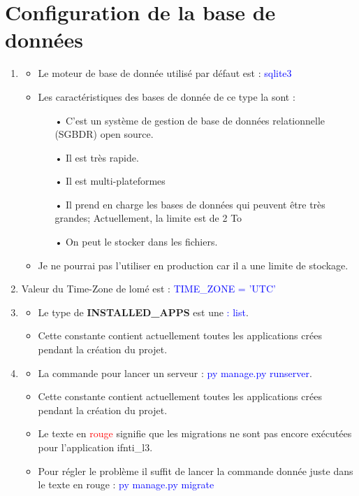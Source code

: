 \documentclass[10pt,a4paper]{article}
\begin{document}
\section{Configuration de la base de données}

\begin{enumerate}
\item 
\begin{itemize}
\item[]
\item Le moteur de base de donnée utilisé par défaut est  : \textcolor{blue}{sqlite3}

\item Les caractéristiques des bases de donnée de ce type la sont : \\
\begin{itemize}
\item[•] C'est un système de gestion de base de données relationnelle (SGBDR) open source.
\item[•] Il est très rapide.
\item[•] Il est multi-plateformes
\item[•] Il prend en charge les bases de données qui peuvent être très grandes; Actuellement, la limite est de 2 To
\item[•] On peut le stocker dans les fichiers.
\end{itemize}
\item Je ne pourrai pas l'utiliser en production car il a une limite de stockage.
\end{itemize}
\item Valeur du Time-Zone de lomé est : \textcolor{blue}{TIME\_ZONE = 'UTC'}




\item 
\begin{itemize}
\item[]
\item Le type de \textbf{INSTALLED\_APPS}  est une \textcolor{blue}{: list}.
\item Cette constante contient actuellement toutes les applications crées pendant la création du projet.
\end{itemize}

\item 
\begin{itemize}
\item[]
\item La commande pour lancer un serveur : \textcolor{blue}{py manage.py runserver}.
\item Cette constante contient actuellement toutes les applications crées pendant la création du projet.
\item Le texte en \textcolor{red}{rouge} signifie que les migrations ne sont pas encore exécutées pour l'application ifnti\_l3.
\item Pour régler le problème il suffit de lancer la commande donnée juste dans le texte en rouge : \textcolor{blue}{py manage.py migrate}
\end{itemize}
\end{enumerate}
\end{document}
